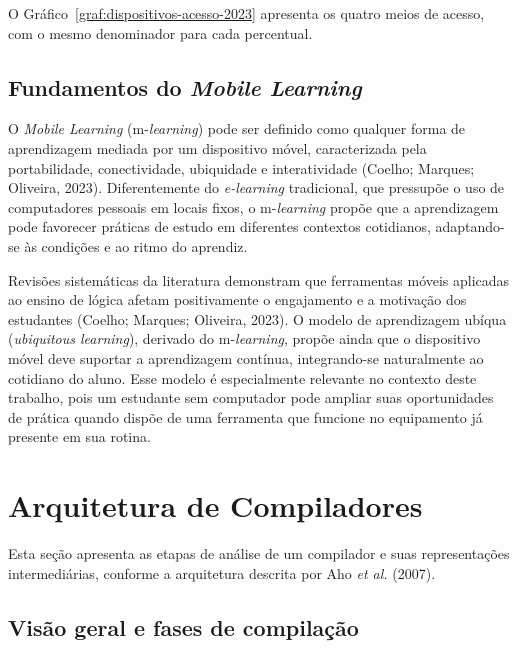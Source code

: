\documentclass[
    12pt
    ,oneside
    ,a4paper
    ,chapter=TITLE
    ,section=TITLE
    ,sumario=abnt-6027-2012]{abntex2}
\newcommand{\citeCoelho}{(Coelho; Marques; Oliveira, 2023)}
\newcommand{\textAho}{Aho \textit{et al.} (2007)\xspace}
\renewcommand{\legenda}[2][]{%
    \centering
    \caption[\MakeTextUppercase{#2}]{\maybeLabel{#1}\MakeTextUppercase{#2}}%
}
\begin{document}
O Gráfico~\ref{graf:dispositivos-acesso-2023} apresenta os quatro meios de acesso,
com o mesmo denominador para cada percentual.

\begin{grafico}[htbp]
    \legenda[graf:dispositivos-acesso-2023]{Meios de acesso à internet utilizados pelas pessoas de 10 anos ou mais que acessaram a internet — Brasil, 2023}
    
\end{grafico}

\subsection{Fundamentos do \textit{Mobile Learning}}

O \textit{Mobile Learning} (m-\textit{learning}) pode ser definido como qualquer forma de
aprendizagem mediada por um dispositivo móvel, caracterizada pela portabilidade, conectividade,
ubiquidade e interatividade \citeCoelho. Diferentemente do \textit{e-learning} tradicional,
que pressupõe o uso de computadores pessoais em locais fixos, o m-\textit{learning} propõe que
a aprendizagem pode favorecer práticas de estudo em diferentes contextos cotidianos, adaptando-se
às condições e ao ritmo do aprendiz.

Revisões sistemáticas da literatura demonstram que ferramentas móveis aplicadas ao ensino de
lógica afetam positivamente o engajamento e a motivação dos estudantes \citeCoelho. O
modelo de aprendizagem ubíqua (\textit{ubiquitous learning}), derivado do m-\textit{learning},
propõe ainda que o dispositivo móvel deve suportar a aprendizagem contínua, integrando-se
naturalmente ao cotidiano do aluno. Esse modelo é especialmente relevante no contexto deste
trabalho, pois um estudante sem computador pode ampliar suas oportunidades de prática quando
dispõe de uma ferramenta que funcione no equipamento já presente em sua rotina.

\section{Arquitetura de Compiladores}

Esta seção apresenta as etapas de análise de um compilador e suas
representações intermediárias, conforme a arquitetura descrita por \textAho.

\subsection{Visão geral e fases de compilação}
\end{document}
